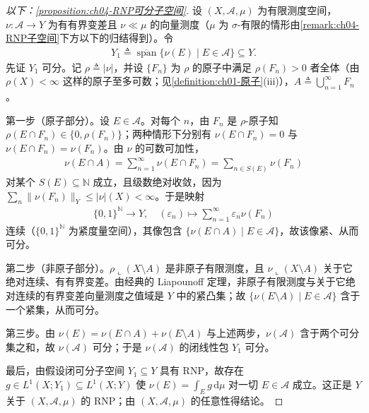 \documentclass[../../main.tex]{subfiles}%
\begin{document}
\begin{proof}[以下：\cref{proposition:ch04-RNP可分子空间}]
设 $(X,\mathcal{A},\mu)$ 为有限测度空间，$\nu:\mathcal{A}\to Y$ 为有有界变差且 $\nu\ll\mu$ 的向量测度（$\mu$ 为 $\sigma$-有限的情形由\cref{remark:ch04-RNP子空间}下方以下的归结得到）。令
\begin{align*}
Y_1\triangleq \overline{\operatorname{span}}\{\nu(E)\mid E\in\mathcal{A}\}\subseteq Y.
\end{align*}
先证 $Y_1$ 可分。记 $\rho\triangleq|\nu|$，并设 $\{F_n\}$ 为 $\rho$ 的原子中满足 $\rho(F_n)>0$ 者全体（由 $\rho(X)<\infty$ 这样的原子至多可数；见\cref{definition:ch01-原子}(iii)），$A\triangleq\bigcup_{n=1}^\infty F_n$。

第一步（原子部分）。设 $E\in\mathcal{A}$。对每个 $n$，由 $F_n$ 是 $\rho$-原子知 $\rho(E\cap F_n)\in\{0,\rho(F_n)\}$；两种情形下分别有 $\nu(E\cap F_n)=0$ 与 $\nu(E\cap F_n)=\nu(F_n)$。由 $\nu$ 的可数可加性，
\begin{align*}
\nu(E\cap A)=\sum_{n=1}^\infty\nu(E\cap F_n)=\sum_{n\in S(E)}\nu(F_n)
\end{align*}
对某个 $S(E)\subseteq\mathbb{N}$ 成立，且级数绝对收敛，因为 $\sum_n\|\nu(F_n)\|_Y\leqslant|\nu|(X)<\infty$。于是映射
\begin{align*}
\{0,1\}^\mathbb{N}\to Y,\quad (\varepsilon_n)\mapsto\sum_{n=1}^\infty\varepsilon_n\nu(F_n)
\end{align*}
连续（$\{0,1\}^\mathbb{N}$ 为紧度量空间），其像包含 $\{\nu(E\cap A)\mid E\in\mathcal{A}\}$，故该像紧、从而可分。

第二步（非原子部分）。$\rho\llcorner(X\setminus A)$ 是非原子有限测度，且 $\nu\llcorner(X\setminus A)$ 关于它绝对连续、有有界变差。由经典的 Liapounoff 定理，非原子有限测度与关于它绝对连续的有界变差向量测度之值域是 $Y$ 中的紧凸集；故 $\{\nu(E\setminus A)\mid E\in\mathcal{A}\}$ 含于一个紧集，从而可分。

第三步。由 $\nu(E)=\nu(E\cap A)+\nu(E\setminus A)$ 与上述两步，$\nu(\mathcal{A})$ 含于两个可分集之和，故 $\nu(\mathcal{A})$ 可分；于是 $\nu(\mathcal{A})$ 的闭线性包 $Y_1$ 可分。

最后，由假设闭可分子空间 $Y_1\subseteq Y$ 具有 RNP，故存在 $g\in L^1(X;Y_1)\subseteq L^1(X;Y)$ 使 $\nu(E)=\int_E g\,\mathrm{d}\mu$ 对一切 $E\in\mathcal{A}$ 成立。这正是 $Y$ 关于 $(X,\mathcal{A},\mu)$ 的 RNP；由 $(X,\mathcal{A},\mu)$ 的任意性得结论。
\end{proof}
\end{document}
